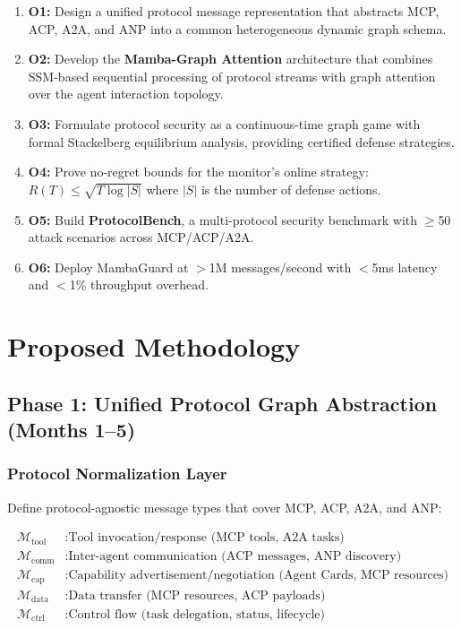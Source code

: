 \documentclass[12pt,a4paper]{article}
\begin{document}
\begin{enumerate}
    \item \textbf{O1:} Design a unified protocol message representation that abstracts MCP, ACP, A2A, and ANP into a common heterogeneous dynamic graph schema.
    
    \item \textbf{O2:} Develop the \textbf{Mamba-Graph Attention} architecture that combines SSM-based sequential processing of protocol streams with graph attention over the agent interaction topology.
    
    \item \textbf{O3:} Formulate protocol security as a continuous-time graph game with formal Stackelberg equilibrium analysis, providing certified defense strategies.
    
    \item \textbf{O4:} Prove no-regret bounds for the monitor's online strategy: $R(T) \leq \sqrt{T \log |S|}$ where $|S|$ is the number of defense actions.
    
    \item \textbf{O5:} Build \textbf{ProtocolBench}, a multi-protocol security benchmark with $\geq$50 attack scenarios across MCP/ACP/A2A.
    
    \item \textbf{O6:} Deploy MambaGuard at $>$1M messages/second with $<$5ms latency and $<$1\% throughput overhead.
\end{enumerate}

\section{Proposed Methodology}

\subsection{Phase 1: Unified Protocol Graph Abstraction (Months 1--5)}

\subsubsection{Protocol Normalization Layer}

Define protocol-agnostic message types that cover MCP, ACP, A2A, and ANP:

\begin{align}
    \mathcal{M}_{\text{tool}} &: \text{Tool invocation/response (MCP tools, A2A tasks)} \\
    \mathcal{M}_{\text{comm}} &: \text{Inter-agent communication (ACP messages, ANP discovery)} \\
    \mathcal{M}_{\text{cap}} &: \text{Capability advertisement/negotiation (Agent Cards, MCP resources)} \\
    \mathcal{M}_{\text{data}} &: \text{Data transfer (MCP resources, ACP payloads)} \\
    \mathcal{M}_{\text{ctrl}} &: \text{Control flow (task delegation, status, lifecycle)}
\end{align}
\end{document}
